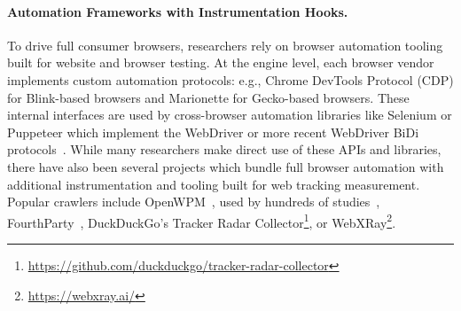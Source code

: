 \paragraph{Automation Frameworks with Instrumentation Hooks.} To drive full consumer browsers, researchers rely on browser automation tooling built for website and browser testing. At the engine level, each browser vendor implements custom automation protocols: e.g., Chrome DevTools Protocol (CDP) for Blink-based browsers and Marionette for Gecko-based browsers. These internal interfaces are used by cross-browser automation libraries like Selenium or Puppeteer which implement the WebDriver or more recent WebDriver BiDi protocols~\cite{cross-browser-testing-1-2020,puppeteer-support-firefox-2024}. While many researchers make direct use of these APIs and libraries, there have also been several projects which bundle full browser automation with additional instrumentation and tooling built for web tracking measurement. Popular crawlers include  OpenWPM~\cite{englehardtOnlineTracking1millionsite2016}, used by hundreds of studies~\cite{openwpm4StudiesUsing}, FourthParty~\cite{mayerFourthpartyFourthpartyFourthParty2011}, DuckDuckGo's Tracker Radar Collector\footnote{\url{https://github.com/duckduckgo/tracker-radar-collector}}, or WebXRay\footnote{\url{https://webxray.ai/}}.

